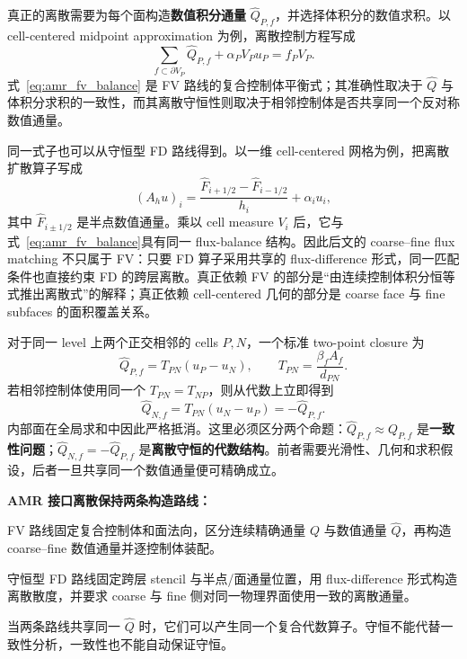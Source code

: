 真正的离散需要为每个面构造\textbf{数值积分通量} $\widehat Q_{P,f}$，并选择体积分的数值求积。以 cell-centered midpoint approximation 为例，离散控制方程写成
\begin{equation}
\boxed{
\sum_{f\subset\partial V_P}\widehat Q_{P,f}
+\alpha_PV_Pu_P
=f_PV_P.
}
\label{eq:amr_fv_balance}
\end{equation}
式~\eqref{eq:amr_fv_balance} 是 FV 路线的复合控制体平衡式；其准确性取决于 $\widehat Q$ 与体积分求积的一致性，而其离散守恒性则取决于相邻控制体是否共享同一个反对称数值通量。

同一式子也可以从守恒型 FD 路线得到。以一维 cell-centered 网格为例，把离散扩散算子写成
\begin{equation}
(A_hu)_i
=
\frac{\widehat F_{i+1/2}-\widehat F_{i-1/2}}{h_i}
+\alpha_i u_i,
\label{eq:amr-conservative-fd-flux-difference}
\end{equation}
其中 $\widehat F_{i\pm1/2}$ 是半点数值通量。乘以 cell measure $V_i$ 后，它与式~\eqref{eq:amr_fv_balance}具有同一 flux-balance 结构。因此后文的 coarse--fine flux matching 不只属于 FV：只要 FD 算子采用共享的 flux-difference 形式，同一匹配条件也直接约束 FD 的跨层离散。真正依赖 FV 的部分是“由连续控制体积分恒等式推出离散式”的解释；真正依赖 cell-centered 几何的部分是 coarse face 与 fine subfaces 的面积覆盖关系。

对于同一 level 上两个正交相邻的 cells $P,N$，一个标准 two-point closure 为
\begin{equation}
\widehat Q_{P,f}
=T_{PN}(u_P-u_N),
\qquad
T_{PN}=\frac{\beta_fA_f}{d_{PN}}.
\label{eq:amr_same_level_transmissibility}
\end{equation}
若相邻控制体使用同一个 $T_{PN}=T_{NP}$，则从代数上立即得到
\begin{equation}
\widehat Q_{N,f}
=T_{PN}(u_N-u_P)
=-\widehat Q_{P,f}.
\label{eq:amr-same-level-antisymmetry}
\end{equation}
内部面在全局求和中因此严格抵消。这里必须区分两个命题：$\widehat Q_{P,f}\approx Q_{P,f}$ 是\textbf{一致性问题}；$\widehat Q_{N,f}=-\widehat Q_{P,f}$ 是\textbf{离散守恒的代数结构}。前者需要光滑性、几何和求积假设，后者一旦共享同一个数值通量便可精确成立。

\begin{keybox}
\textbf{AMR 接口离散保持两条构造路线：}

FV 路线固定复合控制体和面法向，区分连续精确通量 $Q$ 与数值通量 $\widehat Q$，再构造 coarse--fine 数值通量并逐控制体装配。

守恒型 FD 路线固定跨层 stencil 与半点/面通量位置，用 flux-difference 形式构造离散散度，并要求 coarse 与 fine 侧对同一物理界面使用一致的离散通量。

当两条路线共享同一 $\widehat Q$ 时，它们可以产生同一个复合代数算子。守恒不能代替一致性分析，一致性也不能自动保证守恒。
\end{keybox}

